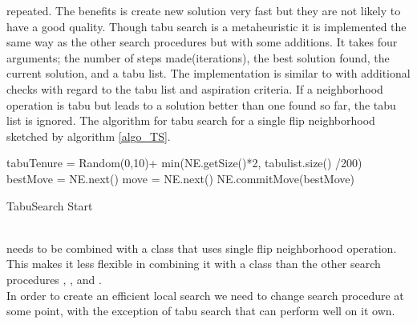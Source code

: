 repeated. The benefits is create new solution very fast but they are not likely to have a good quality.  
Though tabu search is a metaheuristic it is implemented the same way as the other search procedures but with some 
additions. It takes four arguments; the number of steps made(iterations), the best solution found, the current 
solution, and a tabu list. The implementation is similar to  with additional checks with regard 
to the tabu list and aspiration criteria. If a neighborhood operation is tabu but leads to a solution better than one 
found so far, the tabu list is ignored. The algorithm for tabu search for a single flip neighborhood sketched by 
algorithm \ref{algo_TS}. \\ 
\IncMargin{1em}
\begin{algorithm}[H]

  \algdata
{}
\BlankLine
\int tabuTenure = Random(0,10)+ min(NE.getSize()*2, tabulist.size() /200) \;
 bestMove = NE.next() \;
 move = NE.next() \;
NE.commitMove(bestMove) \;

\caption{TabuSearch Start} \label{algo_TS} 
\end{algorithm} \noindent
\DecMargin{1em} \\
 needs to be combined with a  class that uses single flip neighborhood operation. 
This makes it less flexible in combining it with a  class than the other search procedures 
, , and . \\ 
In order to create an efficient local search we need to change search procedure at some point, with the exception of 
tabu search that can perform well on it own. 



